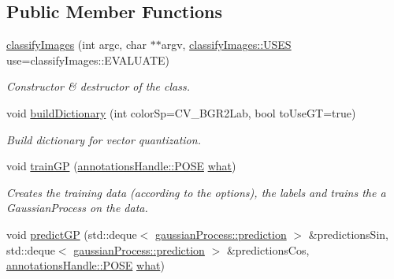 \subsection*{Public Member Functions}
\begin{DoxyCompactItemize}
\item 
\hypertarget{classclassifyImages_ac9559a032acdc161e024e18c2a3f0916}{
\hyperlink{classclassifyImages_ac9559a032acdc161e024e18c2a3f0916}{classifyImages} (int argc, char $\ast$$\ast$argv, \hyperlink{classclassifyImages_a7fab19a2fed8c0c376fdb8f7c16abb6b}{classifyImages::USES} use=classifyImages::EVALUATE)}
\label{classclassifyImages_ac9559a032acdc161e024e18c2a3f0916}

\begin{DoxyCompactList}\small\item\em Constructor \& destructor of the class. \item\end{DoxyCompactList}\item 
\hypertarget{classclassifyImages_aa59ef1800a8b93aae254810b3bca11d7}{
void \hyperlink{classclassifyImages_aa59ef1800a8b93aae254810b3bca11d7}{buildDictionary} (int colorSp=CV\_\-BGR2Lab, bool toUseGT=true)}
\label{classclassifyImages_aa59ef1800a8b93aae254810b3bca11d7}

\begin{DoxyCompactList}\small\item\em Build dictionary for vector quantization. \item\end{DoxyCompactList}\item 
\hypertarget{classclassifyImages_a665b3293ae3bb47f1f73483e3c1a187d}{
void \hyperlink{classclassifyImages_a665b3293ae3bb47f1f73483e3c1a187d}{trainGP} (\hyperlink{classannotationsHandle_a7a9e324ff6c85eeb2c2bd91b2b8cbdba}{annotationsHandle::POSE} \hyperlink{classclassifyImages_a9e23cf1c143525bef9b6b2422417cea9}{what})}
\label{classclassifyImages_a665b3293ae3bb47f1f73483e3c1a187d}

\begin{DoxyCompactList}\small\item\em Creates the training data (according to the options), the labels and trains the a {\ttfamily GaussianProcess} on the data. \item\end{DoxyCompactList}\item 
\hypertarget{classclassifyImages_a5cc0ec230cd62c017dedf0302155df56}{
void \hyperlink{classclassifyImages_a5cc0ec230cd62c017dedf0302155df56}{predictGP} (std::deque$<$ \hyperlink{structgaussianProcess_1_1prediction}{gaussianProcess::prediction} $>$ \&predictionsSin, std::deque$<$ \hyperlink{structgaussianProcess_1_1prediction}{gaussianProcess::prediction} $>$ \&predictionsCos, \hyperlink{classannotationsHandle_a7a9e324ff6c85eeb2c2bd91b2b8cbdba}{annotationsHandle::POSE} \hyperlink{classclassifyImages_a9e23cf1c143525bef9b6b2422417cea9}{what})}
\label{classclassifyImages_a5cc0ec230cd62c017dedf0302155df56}


\end{DoxyCompactItemize}
